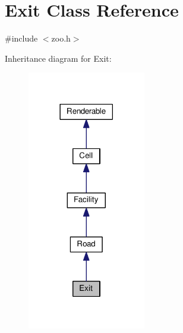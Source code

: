 \hypertarget{classExit}{}\section{Exit Class Reference}
\label{classExit}


{\ttfamily \#include $<$zoo.\+h$>$}



Inheritance diagram for Exit\+:
\nopagebreak
\begin{figure}[H]
\begin{center}
\leavevmode
\includegraphics[width=146pt]{classExit__inherit__graph}
\end{center}
\end{figure}


